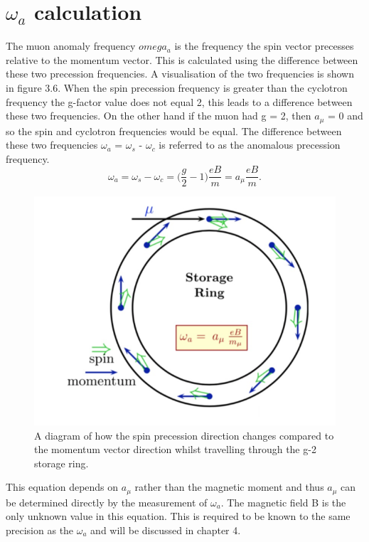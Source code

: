 \section{$\omega_{a}$ calculation}

The muon anomaly frequency $omega_{a}$ is the frequency the spin vector precesses relative to the momentum vector. This is calculated using the difference between these two precession frequencies. A visualisation of the two frequencies is shown in figure 3.6. When the spin precession frequency is greater than the cyclotron frequency the g-factor value does not equal 2, this leads to a difference between these two frequencies. On the other hand if the muon had g = 2, then $a_{\mu}$ = 0 and so the spin and cyclotron frequencies would be equal.
The difference between these two frequencies $\omega_{a}$ = $\omega_{s}$ - $\omega_{c}$ is referred to as the anomalous precession frequency. 
\begin{equation}
\omega_{a} = \omega_{s} - \omega_{c} = \bigg(\frac{g}{2}-1\bigg)\frac{eB}{m} = a_{\mu}\frac{eB}{m}.
\end{equation}

\begin{figure}[th]
\centering
\includegraphics[scale=0.9]{Figures/spin_mom_diff}
\decoRule
\caption{A diagram of how the spin precession direction changes compared to the momentum vector direction whilst travelling through the g-2 storage ring.}
\label{fig:spin_mom_diff}
\end{figure}

This equation depends on $a_\mu$ rather than the magnetic moment and thus $a_\mu$ can be determined directly by the measurement of $\omega_{a}$. The magnetic field B is the only unknown value in this equation. This is required to be known to the same precision as the $\omega_{a}$ and will be discussed in chapter 4.

